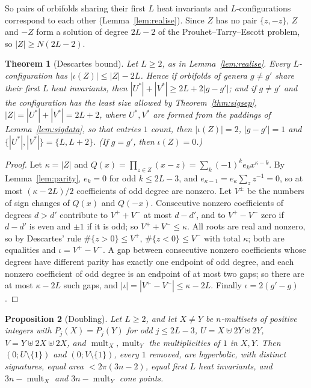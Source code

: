 \documentclass[pdflatex,sn-mathphys-num]{sn-jnl}
\theoremstyle{thmstyleone}%
\newtheorem{theorem}{Theorem}[section]%
\newtheorem{proposition}[theorem]{Proposition}%
\theoremstyle{thmstylethree}%
\newcommand{\mult}{\operatorname{mult}}
\begin{document}
So pairs of orbifolds sharing their first $L$ heat invariants and $L$-configurations correspond to each other (Lemma~\ref{lem:realise}). Since $Z$ has no pair $\{z,-z\}$, $Z$ and $-Z$ form a solution of degree $2L-2$ of the Prouhet--Tarry--Escott problem, so $|Z|\ge N(2L-2)$.

\begin{theorem}[Descartes bound]\label{thm:descartes}
Let $L\ge2$, as in Lemma~\ref{lem:realise}. Every $L$-configuration has $|\iota(Z)|\le|Z|-2L$. Hence if orbifolds of genera $g\ne g'$ share their first $L$ heat invariants, then $|U^*|+|V^*|\ge2L+2|g-g'|$; and if $g\ne g'$ and the configuration has the least size allowed by Theorem~\ref{thm:sigsep}, $|Z|=|U^*|+|V^*|=2L+2$, where $U^*,V^*$ are formed from the paddings of Lemma~\ref{lem:sigdata}, so that entries $1$ count, then $|\iota(Z)|=2$, $|g-g'|=1$ and $\{|U^*|,|V^*|\}=\{L,L+2\}$. (If $g=g'$, then $\iota(Z)=0$.)
\end{theorem}

\begin{proof}
Let $\kappa=|Z|$ and $Q(x)=\prod_{z\in Z}(x-z)=\sum_k(-1)^ke_kx^{\kappa-k}$. By Lemma~\ref{lem:parity}, $e_k=0$ for odd $k\le2L-3$, and $e_{\kappa-1}=e_\kappa\sum_zz^{-1}=0$, so at most $(\kappa-2L)/2$ coefficients of odd degree are nonzero. Let $V^\pm$ be the numbers of sign changes of $Q(x)$ and $Q(-x)$. Consecutive nonzero coefficients of degrees $d>d'$ contribute to $V^++V^-$ at most $d-d'$, and to $V^+-V^-$ zero if $d-d'$ is even and $\pm1$ if it is odd; so $V^++V^-\le \kappa$. All roots are real and nonzero, so by Descartes' rule $\#\{z>0\}\le V^+$, $\#\{z<0\}\le V^-$ with total $\kappa$; both are equalities and $\iota=V^+-V^-$. A gap between consecutive nonzero coefficients whose degrees have different parity has exactly one endpoint of odd degree, and each nonzero coefficient of odd degree is an endpoint of at most two gaps; so there are at most $\kappa-2L$ such gaps, and $|\iota|=|V^+-V^-|\le \kappa-2L$. Finally $\iota=2(g'-g)$.
\end{proof}

\begin{proposition}[Doubling]\label{prop:doubling}
Let $L\ge2$, and let $X\ne Y$ be $n$-multisets of positive integers with $P_j(X)=P_j(Y)$ for odd $j\le2L-3$, $U=X\uplus2Y\uplus2Y$, $V=Y\uplus2X\uplus2X$, and $\mult_X,\mult_Y$ the multiplicities of $1$ in $X,Y$. Then $(0;U\setminus\{1\})$ and $(0;V\setminus\{1\})$, every $1$ removed, are hyperbolic, with distinct signatures, equal area $<2\pi(3n-2)$, equal first $L$ heat invariants, and $3n-\mult_X$ and $3n-\mult_Y$ cone points.
\end{proposition}
\end{document}
